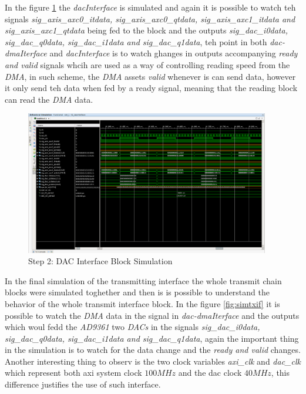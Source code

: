  In the figure \ref{fig:simdac} the \textit{dacInterface} is simulated and again
 it is possible to watch teh signals \textit{sig\_axis\_axc0\_itdata,
 sig\_axis\_axc0\_qtdata, sig\_axis\_axc1\_itdata and sig\_axis\_axc1\_qtdata} being fed
 to the block and the outputs \textit{sig\_dac\_i0data, sig\_dac\_q0data,
 sig\_dac\_i1data and sig\_dac\_q1data}, teh point in both \textit{dac-dmaIterface}
 and \textit{dacInterface} is to watch ghanges in outputs accompanying
 \textit{ready and valid} signals whcih are used as a way of controlling reading
 speed from the \textit{DMA}, in such scheme, the \textit{DMA} assets
 \textit{valid} whenever is can send data, however it only send teh data when
 fed by a ready signal, meaning that the reading block can read the \textit{DMA}
 data.

\begin{figure}[htbp]
    \centering
    \includegraphics[width=0.95\textwidth]{./figures/dacInterface}
    \caption{ Step 2: DAC Interface Block Simulation
    \label{fig:simdac}}
\end{figure}

In the final simulation of the transmitting interface the whole transmit chain
blocks were simulated toghether and then is is possible to understand the
behavior of the whole transmit interface block. In the figure \ref{fig:simtxif}
it is possible to watch the \textit{DMA} data in the signal in
\textit{dac-dmaIterface} and the outputs which woul fedd the \textit{AD9361}
two \textit{DACs} in the signals \textit{sig\_dac\_i0data, sig\_dac\_q0data,
sig\_dac\_i1data and sig\_dac\_q1data}, again the important thing in the simulation
is to watch for the data change and the  \textit{ready and valid} changes.
Another interesting thing to observ is the two clock variables \textit{axi\_clk}
and \textit{dac\_clk} which represent both axi system clock $ 100 MHz$ and the
dac clock $40 MHz$, this difference justifies the use of such interface.


